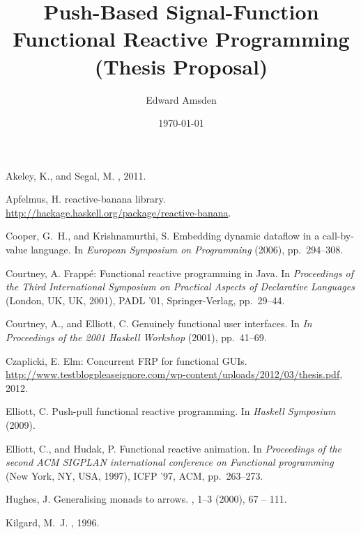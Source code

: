\documentclass[letterpaper]{article}
\title{Push-Based Signal-Function Functional Reactive Programming (Thesis Proposal)}
\author{Edward Amsden}
\date{\today}
\begin{document}
\maketitle






%
\begin{thebibliography}{10}

{\sc Akeley, K., and Segal, M.}
, 2011.

{\sc Apfelmus, H.}
\newblock reactive-banana library.
\newblock \mbox{\url{http://hackage.haskell.org/package/reactive-banana}}.

{\sc Cooper, G.~H., and Krishnamurthi, S.}
\newblock Embedding dynamic dataflow in a call-by-value language.
\newblock In {\em European Symposium on Programming\/} (2006), pp.~294--308.

{\sc Courtney, A.}
\newblock Frapp\'{e}: Functional reactive programming in {J}ava.
\newblock In {\em Proceedings of the Third International Symposium on Practical
  Aspects of Declarative Languages\/} (London, UK, UK, 2001), PADL '01,
  Springer-Verlag, pp.~29--44.

{\sc Courtney, A., and Elliott, C.}
\newblock Genuinely functional user interfaces.
\newblock In {\em In Proceedings of the 2001 Haskell Workshop\/} (2001),
  pp.~41--69.

{\sc Czaplicki, E.}
\newblock Elm: Concurrent {FRP} for functional {GUI}s.
\newblock
  \url{http://www.testblogpleaseignore.com/wp-content/uploads/2012/03/thesis.pdf},
  2012.

{\sc Elliott, C.}
\newblock Push-pull functional reactive programming.
\newblock In {\em Haskell Symposium\/} (2009).

{\sc Elliott, C., and Hudak, P.}
\newblock Functional reactive animation.
\newblock In {\em Proceedings of the second ACM SIGPLAN international
  conference on Functional programming\/} (New York, NY, USA, 1997), ICFP '97,
  ACM, pp.~263--273.

{\sc Hughes, J.}
\newblock Generalising monads to arrows.
, 1–3 (2000), 67 -- 111.

{\sc Kilgard, M.~J.}
, 1996.


\end{thebibliography}
\end{document}
